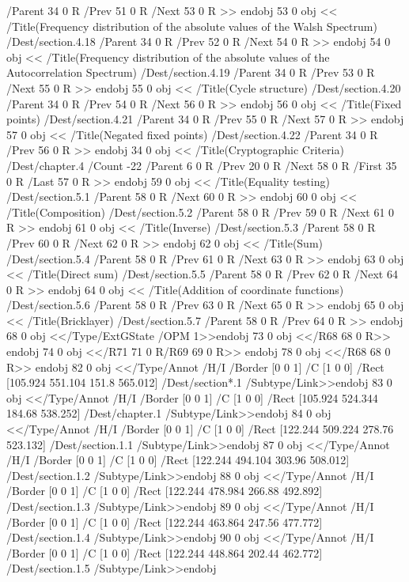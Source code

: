 {{{{{{{{{{{{{{{{{{{{{{{{{{{{/Parent 34 0 R
/Prev 51 0 R
/Next 53 0 R
>>
endobj
53 0 obj
<< /Title(Frequency distribution of the absolute values of the Walsh Spectrum)
/Dest/section.4.18
/Parent 34 0 R
/Prev 52 0 R
/Next 54 0 R
>>
endobj
54 0 obj
<< /Title(Frequency distribution of the absolute values of the Autocorrelation Spectrum)
/Dest/section.4.19
/Parent 34 0 R
/Prev 53 0 R
/Next 55 0 R
>>
endobj
55 0 obj
<< /Title(Cycle structure)
/Dest/section.4.20
/Parent 34 0 R
/Prev 54 0 R
/Next 56 0 R
>>
endobj
56 0 obj
<< /Title(Fixed points)
/Dest/section.4.21
/Parent 34 0 R
/Prev 55 0 R
/Next 57 0 R
>>
endobj
57 0 obj
<< /Title(Negated fixed points)
/Dest/section.4.22
/Parent 34 0 R
/Prev 56 0 R
>>
endobj
34 0 obj
<< /Title(Cryptographic Criteria)
/Dest/chapter.4
/Count -22 /Parent 6 0 R
/Prev 20 0 R
/Next 58 0 R
/First 35 0 R /Last 57 0 R
>>
endobj
59 0 obj
<< /Title(Equality testing)
/Dest/section.5.1
/Parent 58 0 R
/Next 60 0 R
>>
endobj
60 0 obj
<< /Title(Composition)
/Dest/section.5.2
/Parent 58 0 R
/Prev 59 0 R
/Next 61 0 R
>>
endobj
61 0 obj
<< /Title(Inverse)
/Dest/section.5.3
/Parent 58 0 R
/Prev 60 0 R
/Next 62 0 R
>>
endobj
62 0 obj
<< /Title(Sum)
/Dest/section.5.4
/Parent 58 0 R
/Prev 61 0 R
/Next 63 0 R
>>
endobj
63 0 obj
<< /Title(Direct sum)
/Dest/section.5.5
/Parent 58 0 R
/Prev 62 0 R
/Next 64 0 R
>>
endobj
64 0 obj
<< /Title(Addition of coordinate functions)
/Dest/section.5.6
/Parent 58 0 R
/Prev 63 0 R
/Next 65 0 R
>>
endobj
65 0 obj
<< /Title(Bricklayer)
/Dest/section.5.7
/Parent 58 0 R
/Prev 64 0 R
>>
endobj
68 0 obj
<</Type/ExtGState
/OPM 1>>endobj
73 0 obj
<</R68
68 0 R>>
endobj
74 0 obj
<</R71
71 0 R/R69
69 0 R>>
endobj
78 0 obj
<</R68
68 0 R>>
endobj
82 0 obj
<</Type/Annot
/H/I
/Border [0 0 1]
/C [1 0 0]
/Rect [105.924 551.104 151.8 565.012]
/Dest/section*.1
/Subtype/Link>>endobj
83 0 obj
<</Type/Annot
/H/I
/Border [0 0 1]
/C [1 0 0]
/Rect [105.924 524.344 184.68 538.252]
/Dest/chapter.1
/Subtype/Link>>endobj
84 0 obj
<</Type/Annot
/H/I
/Border [0 0 1]
/C [1 0 0]
/Rect [122.244 509.224 278.76 523.132]
/Dest/section.1.1
/Subtype/Link>>endobj
87 0 obj
<</Type/Annot
/H/I
/Border [0 0 1]
/C [1 0 0]
/Rect [122.244 494.104 303.96 508.012]
/Dest/section.1.2
/Subtype/Link>>endobj
88 0 obj
<</Type/Annot
/H/I
/Border [0 0 1]
/C [1 0 0]
/Rect [122.244 478.984 266.88 492.892]
/Dest/section.1.3
/Subtype/Link>>endobj
89 0 obj
<</Type/Annot
/H/I
/Border [0 0 1]
/C [1 0 0]
/Rect [122.244 463.864 247.56 477.772]
/Dest/section.1.4
/Subtype/Link>>endobj
90 0 obj
<</Type/Annot
/H/I
/Border [0 0 1]
/C [1 0 0]
/Rect [122.244 448.864 202.44 462.772]
/Dest/section.1.5
/Subtype/Link>>endobj
}}}}}}}}}}}}}}}}}}}}}}}}}}}}
